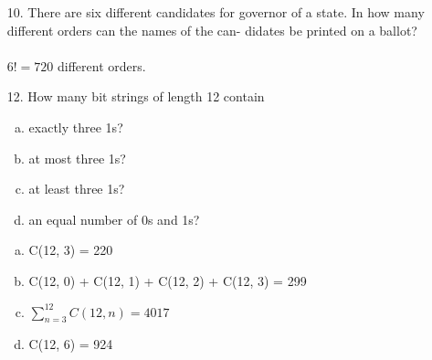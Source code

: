 \begin{itemize}
    \item[10.]  There are six different candidates for governor of a state.
          In how many different orders can the names of the can-
          didates be printed on a ballot? \\
          \answer \\
          $6! = 720$ different orders.

    \item[12.] How many bit strings of length 12 contain
\begin{enumerate}[a.]
    \item exactly three 1s?
    \item at most three 1s?
    \item at least three 1s?
    \item an equal number of 0s and 1s?
\end{enumerate}
\answer
\begin{enumerate}[a.]
    \item C(12, 3) = 220
    \item C(12, 0) + C(12, 1) + C(12, 2) + C(12, 3) = 299
    \item $\sum_{n=3}^{12} C(12, n) = 4017$
    \item C(12, 6) = 924
\end{enumerate}
\end{itemize}



